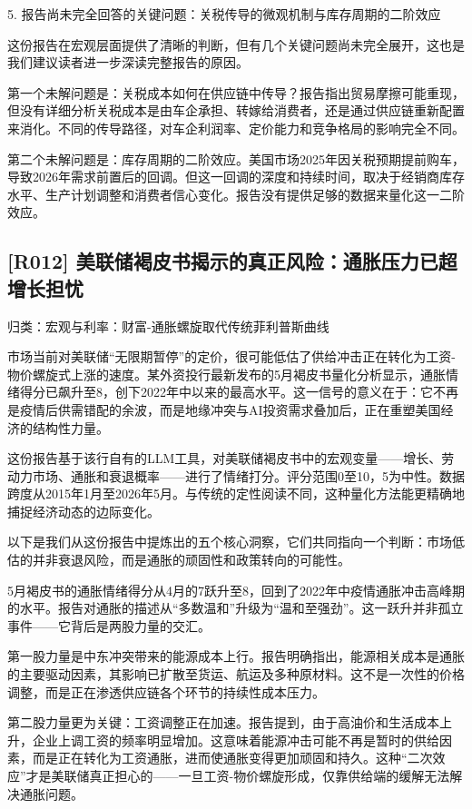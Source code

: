 \documentclass[11pt]{ctexart}
\begin{document}
5. 报告尚未完全回答的关键问题：关税传导的微观机制与库存周期的二阶效应

这份报告在宏观层面提供了清晰的判断，但有几个关键问题尚未完全展开，这也是我们建议读者进一步深读完整报告的原因。

第一个未解问题是：关税成本如何在供应链中传导？报告指出贸易摩擦可能重现，但没有详细分析关税成本是由车企承担、转嫁给消费者，还是通过供应链重新配置来消化。不同的传导路径，对车企利润率、定价能力和竞争格局的影响完全不同。

第二个未解问题是：库存周期的二阶效应。美国市场2025年因关税预期提前购车，导致2026年需求前置后的回调。但这一回调的深度和持续时间，取决于经销商库存水平、生产计划调整和消费者信心变化。报告没有提供足够的数据来量化这一二阶效应。

\subsection{[R012] 美联储褐皮书揭示的真正风险：通胀压力已超增长担忧}
{\small\color{refgray}归类：宏观与利率：财富-通胀螺旋取代传统菲利普斯曲线}

市场当前对美联储“无限期暂停”的定价，很可能低估了供给冲击正在转化为工资-物价螺旋式上涨的速度。某外资投行最新发布的5月褐皮书量化分析显示，通胀情绪得分已飙升至8，创下2022年中以来的最高水平。这一信号的意义在于：它不再是疫情后供需错配的余波，而是地缘冲突与AI投资需求叠加后，正在重塑美国经济的结构性力量。

这份报告基于该行自有的LLM工具，对美联储褐皮书中的宏观变量——增长、劳动力市场、通胀和衰退概率——进行了情绪打分。评分范围0至10，5为中性。数据跨度从2015年1月至2026年5月。与传统的定性阅读不同，这种量化方法能更精确地捕捉经济动态的边际变化。

以下是我们从这份报告中提炼出的五个核心洞察，它们共同指向一个判断：市场低估的并非衰退风险，而是通胀的顽固性和政策转向的可能性。

5月褐皮书的通胀情绪得分从4月的7跃升至8，回到了2022年中疫情通胀冲击高峰期的水平。报告对通胀的描述从“多数温和”升级为“温和至强劲”。这一跃升并非孤立事件——它背后是两股力量的交汇。

第一股力量是中东冲突带来的能源成本上行。报告明确指出，能源相关成本是通胀的主要驱动因素，其影响已扩散至货运、航运及多种原材料。这不是一次性的价格调整，而是正在渗透供应链各个环节的持续性成本压力。

第二股力量更为关键：工资调整正在加速。报告提到，由于高油价和生活成本上升，企业上调工资的频率明显增加。这意味着能源冲击可能不再是暂时的供给因素，而是正在转化为工资通胀，进而使通胀变得更加顽固和持久。这种“二次效应”才是美联储真正担心的——一旦工资-物价螺旋形成，仅靠供给端的缓解无法解决通胀问题。
\end{document}
